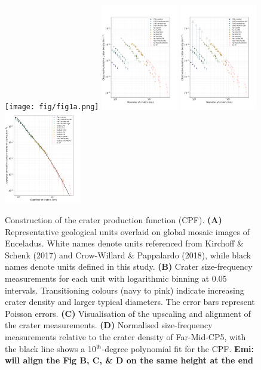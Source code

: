 \documentclass[preprint,12pt,3p,times,authoryear]{elsarticle}
\begin{document}
\begin{figure}[ht!]
    \centering
    \texttt{[image: fig/fig1a.png]}
    \includegraphics[width=0.3\textwidth]{fig/fig1b.png}
    \includegraphics[width=0.3\textwidth]{fig/fig1_arrow.png}
    \includegraphics[width=0.3\textwidth]{fig/fig1c_with_model.png}
    \caption{Construction of the crater production function (CPF).
        \textbf{(A)} Representative geological units overlaid on global mosaic images of Enceladus. White names denote units referenced from Kirchoff \& Schenk (2017) and Crow-Willard \& Pappalardo (2018), while black names denote units defined in this study.
        \textbf{(B)} Crater size-frequency measurements for each unit with logarithmic binning at 0.05 intervals. Transitioning colours (navy to pink) indicate increasing crater density and larger typical diameters. The error bars represent Poisson errors.
        \textbf{(C)} Visualisation of the upscaling and alignment of the crater measurements.
        \textbf{(D)} Normalised size-frequency measurements relative to the crater density of Far-Mid-CP5, with the black line shows a 10$^{\rm th}$-degree polynomial fit for the CPF.
        \textbf{Emi: will align the Fig B, C, \& D on the same height at the end}}
    \label{fig:age}
\end{figure}
\end{document}
